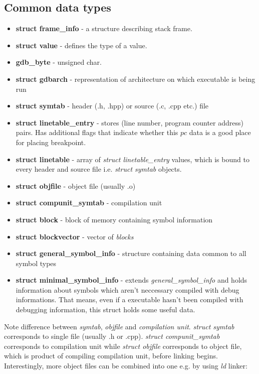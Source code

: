 \documentclass{report}
\begin{document}
\subsection *{Common data types}
\begin{itemize}
	\item \textbf{struct frame\_info} - a structure describing stack frame. 
	\item \textbf{struct value} - defines the type of a value.
	\item \textbf{gdb\_byte} - unsigned char.
	\item \textbf{struct gdbarch} - representation of architecture on which executable is being run
	\item \textbf{struct symtab} - header (.h, .hpp) or source (.c, .cpp etc.) file	
	\item \textbf{struct linetable\_entry} - stores (line number, program counter address) pairs. Has additional flags that indicate whether this $pc$ data is a good place for placing breakpoint.
	\item \textbf{struct linetable} - array of \textit{struct linetable\_entry} values, which is bound to every header and source file i.e. \textit{struct symtab} objects.
	\item \textbf{struct objfile} - object file (usually .o)
	\item \textbf{struct compunit\_symtab} - compilation unit
	\item \textbf{struct block} - block of memory containing symbol information
	\item \textbf{struct blockvector} - vector of \textit{blocks}
	\item \textbf{struct general\_symbol\_info} - structure containing data common to all symbol types
	\item \textbf{struct minimal\_symbol\_info} - extends \textit{general\_symbol\_info} and holds information about symbols
	which aren't neccessary compiled with debug informations. That means,
	even if a executable hasn't been compiled with debugging information, this
	struct holds some useful data.
	

\end{itemize}
Note difference between \textit{symtab}, \textit{objfile} and \textit{compilation unit}.
\textit{struct symtab} corresponds to single file (usually .h or .cpp).
\textit{struct compunit\_symtab} corresponds to compilation unit while
\textit{struct objfile} corresponds to object file, which is product of compiling compilation unit, before linking begins. Interestingly, more object files can be combined into one e.g. by using \textit{ld} linker: 
\end{document}
